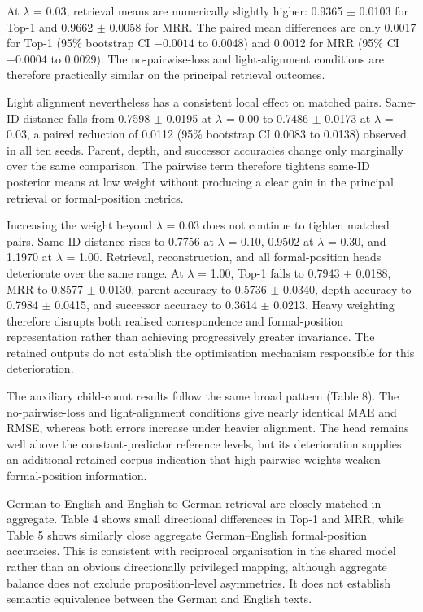 \documentclass[webpdf,modern,medium,namedate]{oup-authoring-template}
\begin{document}
At $\lambda$ = 0.03, retrieval means are numerically slightly higher: 0.9365 $\pm$ 0.0103 for Top-1 and 0.9662 $\pm$ 0.0058 for MRR. The paired mean differences are only 0.0017 for Top-1 (95\% bootstrap CI $-0.0014$ to 0.0048) and 0.0012 for MRR (95\% CI $-0.0004$ to 0.0029). The no-pairwise-loss and light-alignment conditions are therefore practically similar on the principal retrieval outcomes.

Light alignment nevertheless has a consistent local effect on matched pairs. Same-ID distance falls from 0.7598 $\pm$ 0.0195 at $\lambda$ = 0.00 to 0.7486 $\pm$ 0.0173 at $\lambda$ = 0.03, a paired reduction of 0.0112 (95\% bootstrap CI 0.0083 to 0.0138) observed in all ten seeds. Parent, depth, and successor accuracies change only marginally over the same comparison. The pairwise term therefore tightens same-ID posterior means at low weight without producing a clear gain in the principal retrieval or formal-position metrics.

Increasing the weight beyond $\lambda$ = 0.03 does not continue to tighten matched pairs. Same-ID distance rises to 0.7756 at $\lambda$ = 0.10, 0.9502 at $\lambda$ = 0.30, and 1.1970 at $\lambda$ = 1.00. Retrieval, reconstruction, and all formal-position heads deteriorate over the same range. At $\lambda$ = 1.00, Top-1 falls to 0.7943 $\pm$ 0.0188, MRR to 0.8577 $\pm$ 0.0130, parent accuracy to 0.5736 $\pm$ 0.0340, depth accuracy to 0.7984 $\pm$ 0.0415, and successor accuracy to 0.3614 $\pm$ 0.0213. Heavy weighting therefore disrupts both realised correspondence and formal-position representation rather than achieving progressively greater invariance. The retained outputs do not establish the optimisation mechanism responsible for this deterioration.

The auxiliary child-count results follow the same broad pattern (Table 8). The no-pairwise-loss and light-alignment conditions give nearly identical MAE and RMSE, whereas both errors increase under heavier alignment. The head remains well above the constant-predictor reference levels, but its deterioration supplies an additional retained-corpus indication that high pairwise weights weaken formal-position information.

German-to-English and English-to-German retrieval are closely matched in aggregate. Table 4 shows small directional differences in Top-1 and MRR, while Table 5 shows similarly close aggregate German--English formal-position accuracies. This is consistent with reciprocal organisation in the shared model rather than an obvious directionally privileged mapping, although aggregate balance does not exclude proposition-level asymmetries. It does not establish semantic equivalence between the German and English texts.
\end{document}
